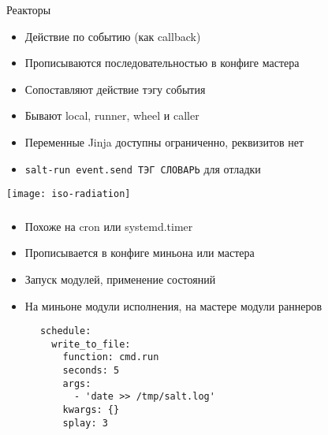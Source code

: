 \liveframe{}

\begin{Frame}{Реакторы}

  \ExampleNote{}

  \begin{itemize}[<+-| alert@ +>]
    \item Действие по событию (как callback)
    \item Прописываются последовательностью в конфиге мастера
    \item Сопоставляют действие тэгу события
    \item Бывают local, runner, wheel и caller
    \item Переменные Jinja доступны ограниченно, реквизитов нет
    \item[\faTerminal] \texttt{salt-run event.send ТЭГ СЛОВАРЬ} для отладки
  \end{itemize}

  \vfill

  \centering
  \texttt{[image: iso-radiation]}
\end{Frame}

\liveframe{}

\begin{frame}[fragile]
  \frametitle{\Insertsubsection}

  \begin{itemize}[<+-| alert@ +>]

    \item Похоже на cron или systemd.timer
    \item Прописывается в конфиге миньона или мастера
    \item Запуск модулей, применение состояний
    \item На миньоне модули исполнения, на мастере модули раннеров
  \end{itemize}

  \onslide<+->
  \begin{center}\begin{minipage}{0.4\textwidth}
    \begin{verbatim}
      schedule:
        write_to_file:
          function: cmd.run
          seconds: 5
          args:
            - 'date >> /tmp/salt.log'
          kwargs: {}
          splay: 3
    \end{verbatim}
  \end{minipage}\end{center}
\end{frame}

